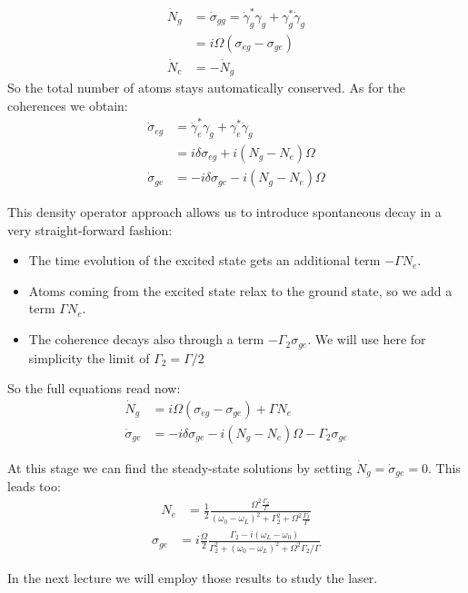 \documentclass[10pt]{article}
\let\cite\citep
\providecommand\citep{\cite}
\begin{document}
\begin{align}
\dot{N}_g &= \dot{\sigma}_{gg} = \dot{\gamma}_{g}^*\gamma_g+ \gamma_{g}^*\dot{\gamma}_g\\
&= i\Omega(\sigma_{eg}-\sigma_{ge})\\
\dot{N}_e &= -\dot{N}_g
\end{align}
So the total number of atoms stays automatically conserved. As for the coherences we obtain:
\begin{align}
\dot{\sigma}_{eg} &= \dot{\gamma}_{e}^*\gamma_g+ \gamma_{e}^*\dot{\gamma}_g\\
&= i\delta \sigma_{eg}+i (N_g-N_e)\Omega\\
\dot{\sigma}_{ge}&= -i\delta \sigma_{ge}-i (N_g-N_e)\Omega
\end{align}

This density operator approach allows us to introduce spontaneous decay in a very straight-forward fashion:
\begin{itemize}
\item The time evolution of the excited state gets an additional term $-\Gamma N_e$.
\item Atoms coming from the excited state relax to the ground state, so we add a term $\Gamma N_e$.
\item The coherence decays also through a term $-\Gamma_2 \sigma_{ge}$. We will use here for simplicity the limit of $\Gamma_2 = \Gamma/2$
\end{itemize}
So the full equations read now:
\begin{align}
\dot{N}_g &= i\Omega(\sigma_{eg}-\sigma_{ge})+\Gamma N_e\\
\dot{\sigma}_{ge}&= -i\delta \sigma_{ge}-i (N_g-N_e)\Omega-\Gamma_2\sigma_{ge}
\end{align}

At this stage we can find the steady-state solutions by setting $\dot{N}_g = \dot{\sigma}_{ge} = 0$. This leads too:
\begin{align}\label{Eq:PopTwoLevel}
N_e &= \frac{1}{2}\frac{\Omega^2 \frac{\Gamma_2}{\Gamma}}{(\omega_0-\omega_L)^2+\Gamma_2^2+\Omega^2\frac{\Gamma_2}{\Gamma}}\end{align}
\begin{align}\label{Eq:CohTwoLevel}
\sigma_{ge} &= i\frac{\Omega}{2}\frac{\Gamma_2-i(\omega_L-\omega_0)}{\Gamma_2^2+(\omega_0-\omega_L)^2+\Omega^2\Gamma_2/\Gamma}
\end{align}

In the next lecture \cite{down-conversion} we will employ those results to study the laser.

\FloatBarrier


\end{document}
